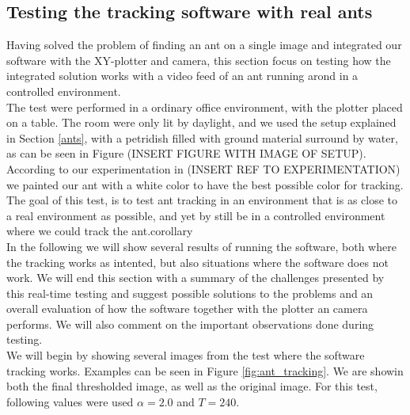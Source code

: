 
% 
% 


\subsection{Testing the tracking software with real ants}
\label{testing}

Having solved the problem of finding an ant on a single image and integrated our software with the XY-plotter and camera, this section focus on testing how the integrated solution works with a video feed of an ant running arond in a controlled environment.\\

The test were performed in a ordinary office environment, with the plotter placed on a table. The room were only lit by daylight, and we used the setup explained in Section \ref{ants}, with a petridish filled with ground material surround by water, as can be seen in Figure (INSERT FIGURE WITH IMAGE OF SETUP). According to our experimentation in (INSERT REF TO EXPERIMENTATION) we painted our ant with a white color to have the best possible color for tracking. The goal of this test, is to test ant tracking in an environment that is as close to a real environment as possible, and yet by still be in a controlled environment where we could track the ant.corollary\\

In the following we will show several results of running the software, both where the tracking works as intented, but also situations where the software does not work. We will end this section with a summary of the challenges presented by this real-time testing and suggest possible solutions to the problems and an overall evaluation of how the software together with the plotter an camera performs. We will also comment on the important observations done during testing.\\

We will begin by showing several images from the test where the software tracking works. Examples can be seen in Figure \ref{fig:ant_tracking}. We are showin both the final thresholded image, as well as the original image. For this test, following values were used $\alpha = 2.0$ and $T = 240$.\\


